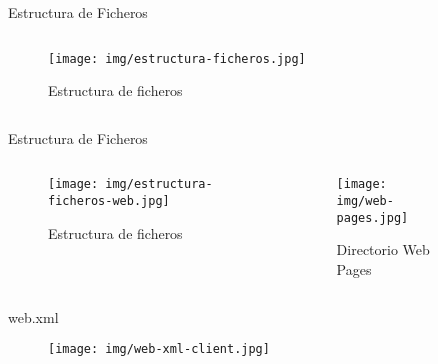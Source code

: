 \documentclass[spanish,xcolor=table,svgnames]{beamer}
\begin{document}
\begin{frame}{Estructura de Ficheros}
  \begin{columns}[onlytextwidth]
    \begin{column}{0.5\textwidth}
      \centering
      \begin{figure}[H]
        \begin{center}
        \texttt{[image: img/estructura-ficheros.jpg]}
        \end{center}
        \caption{Estructura de ficheros}
        \label{fig:estructura-proyecto}
      \end{figure}
    \end{column}
    \begin{column}{0.5\textwidth}
    \end{column}
  \end{columns}
\end{frame}

\begin{frame}{Estructura de Ficheros}
  \begin{columns}[onlytextwidth]
    \begin{column}{0.5\textwidth}
      \centering
      \begin{figure}[H]
        \begin{center}
        \texttt{[image: img/estructura-ficheros-web.jpg]}
        \end{center}
        \caption{Estructura de ficheros}
        \label{fig:estructura-proyecto}
      \end{figure}
    \end{column}
    \begin{column}{0.5\textwidth}
      \centering
      \begin{figure}[H]
        \begin{center}
        \texttt{[image: img/web-pages.jpg]}
        \end{center}
        \caption{Directorio Web Pages}
        \label{fig:estructura-web}
      \end{figure}
    \end{column}
  \end{columns}
\end{frame}


\begin{frame}{web.xml}
  \begin{figure}[H]
    \begin{center}
        \texttt{[image: img/web-xml-client.jpg]}
    \end{center}
    \label{fig:web-xml-client}
  \end{figure}
\end{frame}
\end{document}
